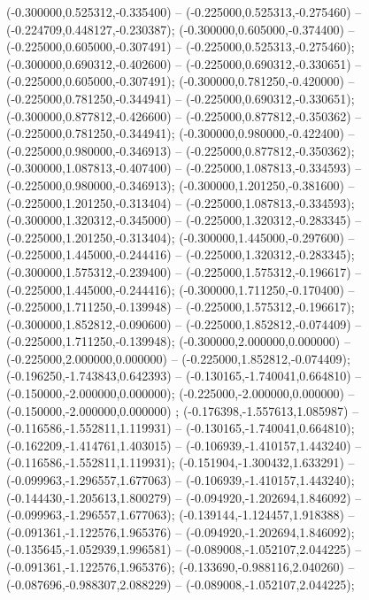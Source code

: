  (-0.300000,0.525312,-0.335400) -- (-0.225000,0.525313,-0.275460) -- (-0.224709,0.448127,-0.230387);
 (-0.300000,0.605000,-0.374400) -- (-0.225000,0.605000,-0.307491) -- (-0.225000,0.525313,-0.275460);
 (-0.300000,0.690312,-0.402600) -- (-0.225000,0.690312,-0.330651) -- (-0.225000,0.605000,-0.307491);
 (-0.300000,0.781250,-0.420000) -- (-0.225000,0.781250,-0.344941) -- (-0.225000,0.690312,-0.330651);
 (-0.300000,0.877812,-0.426600) -- (-0.225000,0.877812,-0.350362) -- (-0.225000,0.781250,-0.344941);
 (-0.300000,0.980000,-0.422400) -- (-0.225000,0.980000,-0.346913) -- (-0.225000,0.877812,-0.350362);
 (-0.300000,1.087813,-0.407400) -- (-0.225000,1.087813,-0.334593) -- (-0.225000,0.980000,-0.346913);
 (-0.300000,1.201250,-0.381600) -- (-0.225000,1.201250,-0.313404) -- (-0.225000,1.087813,-0.334593);
 (-0.300000,1.320312,-0.345000) -- (-0.225000,1.320312,-0.283345) -- (-0.225000,1.201250,-0.313404);
 (-0.300000,1.445000,-0.297600) -- (-0.225000,1.445000,-0.244416) -- (-0.225000,1.320312,-0.283345);
 (-0.300000,1.575312,-0.239400) -- (-0.225000,1.575312,-0.196617) -- (-0.225000,1.445000,-0.244416);
 (-0.300000,1.711250,-0.170400) -- (-0.225000,1.711250,-0.139948) -- (-0.225000,1.575312,-0.196617);
 (-0.300000,1.852812,-0.090600) -- (-0.225000,1.852812,-0.074409) -- (-0.225000,1.711250,-0.139948);
 (-0.300000,2.000000,0.000000) -- (-0.225000,2.000000,0.000000) -- (-0.225000,1.852812,-0.074409);
 (-0.196250,-1.743843,0.642393) -- (-0.130165,-1.740041,0.664810) -- (-0.150000,-2.000000,0.000000);
 (-0.225000,-2.000000,0.000000) -- (-0.150000,-2.000000,0.000000) ;
 (-0.176398,-1.557613,1.085987) -- (-0.116586,-1.552811,1.119931) -- (-0.130165,-1.740041,0.664810);
 (-0.162209,-1.414761,1.403015) -- (-0.106939,-1.410157,1.443240) -- (-0.116586,-1.552811,1.119931);
 (-0.151904,-1.300432,1.633291) -- (-0.099963,-1.296557,1.677063) -- (-0.106939,-1.410157,1.443240);
 (-0.144430,-1.205613,1.800279) -- (-0.094920,-1.202694,1.846092) -- (-0.099963,-1.296557,1.677063);
 (-0.139144,-1.124457,1.918388) -- (-0.091361,-1.122576,1.965376) -- (-0.094920,-1.202694,1.846092);
 (-0.135645,-1.052939,1.996581) -- (-0.089008,-1.052107,2.044225) -- (-0.091361,-1.122576,1.965376);
 (-0.133690,-0.988116,2.040260) -- (-0.087696,-0.988307,2.088229) -- (-0.089008,-1.052107,2.044225);
